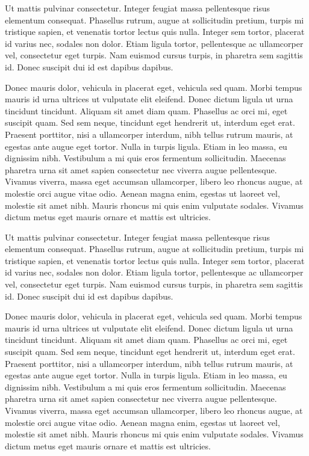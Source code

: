 \documentclass{FramateX}
\begin{document}
                    

Ut mattis pulvinar consectetur. Integer feugiat massa pellentesque risus elementum consequat. Phasellus rutrum, augue at sollicitudin pretium, turpis mi tristique sapien, et venenatis tortor lectus quis nulla. Integer sem tortor, placerat id varius nec, sodales non dolor. Etiam ligula tortor, pellentesque ac ullamcorper vel, consectetur eget turpis. Nam euismod cursus turpis, in pharetra sem sagittis id. Donec suscipit dui id est dapibus dapibus.

Donec mauris dolor, vehicula in placerat eget, vehicula sed quam. Morbi tempus mauris id urna ultrices ut vulputate elit eleifend. Donec dictum ligula ut urna tincidunt tincidunt. Aliquam sit amet diam quam. Phasellus ac orci mi, eget suscipit quam. Sed sem neque, tincidunt eget hendrerit ut, interdum eget erat. Praesent porttitor, nisi a ullamcorper interdum, nibh tellus rutrum mauris, at egestas ante augue eget tortor. Nulla in turpis ligula. Etiam in leo massa, eu dignissim nibh. Vestibulum a mi quis eros fermentum sollicitudin. Maecenas pharetra urna sit amet sapien consectetur nec viverra augue pellentesque. Vivamus viverra, massa eget accumsan ullamcorper, libero leo rhoncus augue, at molestie orci augue vitae odio. Aenean magna enim, egestas ut laoreet vel, molestie sit amet nibh. Mauris rhoncus mi quis enim vulputate sodales. Vivamus dictum metus eget mauris ornare et mattis est ultricies.


Ut mattis pulvinar consectetur. Integer feugiat massa pellentesque risus elementum consequat. Phasellus rutrum, augue at sollicitudin pretium, turpis mi tristique sapien, et venenatis tortor lectus quis nulla. Integer sem tortor, placerat id varius nec, sodales non dolor. Etiam ligula tortor, pellentesque ac ullamcorper vel, consectetur eget turpis. Nam euismod cursus turpis, in pharetra sem sagittis id. Donec suscipit dui id est dapibus dapibus.

Donec mauris dolor, vehicula in placerat eget, vehicula sed quam. Morbi tempus mauris id urna ultrices ut vulputate elit eleifend. Donec dictum ligula ut urna tincidunt tincidunt. Aliquam sit amet diam quam. Phasellus ac orci mi, eget suscipit quam. Sed sem neque, tincidunt eget hendrerit ut, interdum eget erat. Praesent porttitor, nisi a ullamcorper interdum, nibh tellus rutrum mauris, at egestas ante augue eget tortor. Nulla in turpis ligula. Etiam in leo massa, eu dignissim nibh. Vestibulum a mi quis eros fermentum sollicitudin. Maecenas pharetra urna sit amet sapien consectetur nec viverra augue pellentesque. Vivamus viverra, massa eget accumsan ullamcorper, libero leo rhoncus augue, at molestie orci augue vitae odio. Aenean magna enim, egestas ut laoreet vel, molestie sit amet nibh. Mauris rhoncus mi quis enim vulputate sodales. Vivamus dictum metus eget mauris ornare et mattis est ultricies.
\end{document}
